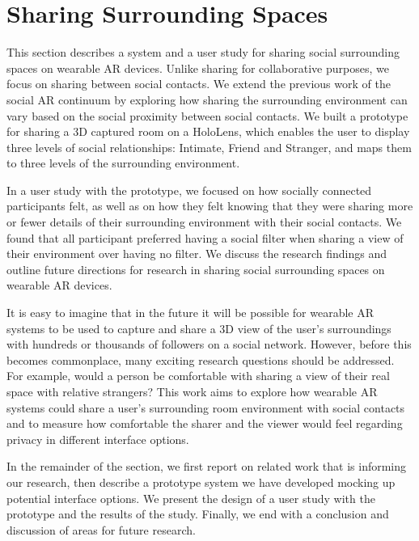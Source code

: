 \section{Sharing Surrounding Spaces}
\label{sec:surrounding:hiding}

This section describes a system and a user study for sharing social surrounding spaces on wearable AR devices. Unlike sharing for collaborative purposes, we focus on sharing between social contacts. We extend the previous work of the social AR continuum by exploring how sharing the surrounding environment can vary based on the social proximity between social contacts. We built a prototype for sharing a 3D captured room on a HoloLens, which enables the user to display three levels of social relationships: Intimate, Friend and Stranger, and maps them to three levels of the surrounding environment. 

In a user study with the prototype, we focused on how socially connected participants felt, as well as on how they felt knowing that they were sharing more or fewer details of their surrounding environment with their social contacts. We found that all participant preferred having a social filter when sharing a view of their environment over having no filter. We discuss the research findings and outline future directions for research in sharing social surrounding spaces on wearable AR devices. 

It is easy to imagine that in the future it will be possible for wearable AR systems to be used to capture and share a 3D view of the user's surroundings with hundreds or thousands of followers on a social network. However, before this becomes commonplace, many exciting research questions should be addressed. For example, would a person be comfortable with sharing a view of their real space with relative strangers? This work aims to explore how wearable AR systems could share a user's surrounding room environment with social contacts and to measure how comfortable the sharer and the viewer would feel regarding privacy in different interface options. 

In the remainder of the section, we first report on related work that is informing our research, then describe a prototype system we have developed mocking up potential interface options. We present the design of a user study with the prototype and the results of the study. Finally, we end with a conclusion and discussion of areas for future research.

